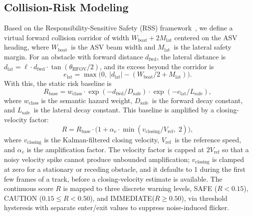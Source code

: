 \subsection{Collision-Risk Modeling}
Based on the Responsibility-Sensitive Safety (RSS) framework~\cite{shalevshwartz2018formalmodelsafescalable}, we define a virtual forward collision corridor of width $W_\mathrm{boat} + 2M_\mathrm{lat}$ centered on the ASV heading, where $W_\mathrm{boat}$\ is the ASV beam width and $M_\mathrm{lat}$\ is the lateral safety margin. For an obstacle with forward distance $d_\mathrm{fwd}$, the lateral distance is $d_\mathrm{lat} = \ell \cdot d_\mathrm{fwd} \cdot \tan(\theta_\mathrm{HFOV}/2)$, and its excess beyond the corridor is
\begin{equation}
  e_\mathrm{lat} = \max\bigl(0,\ |d_\mathrm{lat}| - (W_\mathrm{boat}/2+M_\mathrm{lat})\bigr).
  \label{eq:lateral_excess}
\end{equation}
With this, the static risk baseline is
\begin{equation}
  R_\mathrm{base} = w_\mathrm{class} \cdot \exp\!\left(-d_\mathrm{fwd}/D_\mathrm{safe}\right) \cdot \exp\!\left(-e_\mathrm{lat}/L_\mathrm{safe}\right),
  \label{eq:risk_base}
\end{equation}
where $w_\mathrm{class}$ is the semantic hazard weight, $D_\mathrm{safe}$\, is the forward decay constant, and $L_\mathrm{safe}$\, is the lateral decay constant. This baseline is amplified by a closing-velocity factor:
\begin{equation}
  R = R_\mathrm{base} \cdot \bigl(1 + \alpha_v \cdot \min(v_\mathrm{closing} / V_\mathrm{ref},\; 2)\bigr),
  \label{eq:risk}
\end{equation}
where $v_\mathrm{closing}$ is the Kalman-filtered closing velocity, $V_\mathrm{ref}$\, is the reference speed, and $\alpha_v$ is the amplification factor. The velocity factor is capped at $2V_\mathrm{ref}$ so that a noisy velocity spike cannot produce unbounded amplification; $v_\mathrm{closing}$ is clamped at zero for a stationary or receding obstacle, and it defaults to 1 during the first few frames of a track, before a closing-velocity estimate is available. The continuous score $R$ is mapped to three discrete warning levels, SAFE ($R < 0.15$), CAUTION ($0.15 \le R < 0.50$), and IMMEDIATE($R \ge 0.50$), via threshold hysteresis with separate enter/exit values to suppress noise-induced flicker.


